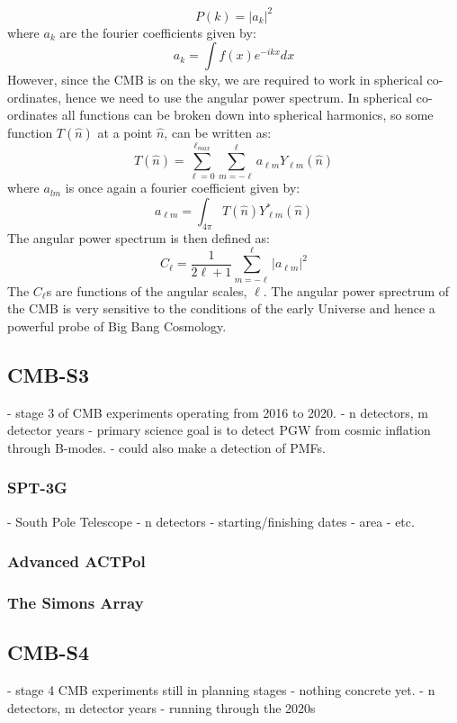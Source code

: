 \begin{equation}
P(k) = \vert a_k \vert ^2
\end{equation}
where $a_k$ are the fourier coefficients given by:
\begin{equation}
a_k = \int f(x) e^{-ikx} dx
\end{equation}
However, since the CMB is on the sky, we are required to work in spherical co-ordinates, hence we need to use the angular power spectrum. In spherical co-ordinates all functions can be broken down into spherical harmonics, so some function $T(\hat{n})$ at a point $\hat{n}$, can be written as:
\begin{equation}
T(\hat{n}) = \sum_{\ell = 0}^{\ell_{max}} \sum_{m = -\ell}^{\ell} a_{\ell m} Y_{\ell m}(\hat{n})
\end{equation}
where $a_{lm}$ is once again a fourier coefficient given by:
\begin{equation}
a_{\ell m} = \int_{4 \pi} T(\hat{n}) Y_{\ell m}^{*}(\hat{n})
\end{equation}
The angular power spectrum is then defined as:
\begin{equation}
C_{\ell} = \frac{1}{2\ell + 1} \sum_{m = -\ell}^{\ell} \vert a_{\ell m} \vert ^2
\end{equation}
The $C_{\ell}$s are functions of the angular scales, $\ell$. The angular power sprectrum of the CMB is very sensitive to the conditions of the early Universe and hence a powerful probe of Big Bang Cosmology.

\subsection{CMB-S3}
	- stage 3 of CMB experiments operating from 2016 to 2020.
	- n detectors, m detector years
	- primary science goal is to detect PGW from cosmic inflation through B-modes.
	- could also make a detection of PMFs.
\subsubsection{SPT-3G}
	- South Pole Telescope
	- n detectors
	- starting/finishing dates
	- area
	- etc.
\subsubsection{Advanced ACTPol}
\subsubsection{The Simons Array}
\subsection{CMB-S4}
	- stage 4 CMB experiments still in planning stages - nothing concrete yet.
	- n detectors, m detector years
	- running through the 2020s